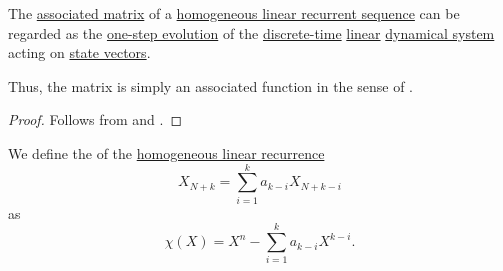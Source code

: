 \begin{corollary}\label{thm:homogeneous_linear_recurrence_as_dynamical_system}
  The \hyperref[def:homogeneous_linear_recurrence_matrix]{associated matrix} of a \hyperref[def:homogeneous_linear_recurrence]{homogeneous linear recurrent sequence} can be regarded as the \hyperref[def:one_step_evolution_function]{one-step evolution} of the \hyperref[def:discrete_dynamical_system]{discrete-time} \hyperref[def:linear_dynamical_system]{linear} \hyperref[def:dynamical_system]{dynamical system} acting on \hyperref[def:recurrence_relation/state]{state vectors}.
\end{corollary}
\begin{comments}
  \item Thus, the matrix is simply an associated function in the sense of .
\end{comments}
\begin{proof}
  Follows from  and .
\end{proof}

\begin{definition}\label{def:linear_recurrence_characteristic_polynomial}
  We define the  of the \hyperref[def:homogeneous_linear_recurrence]{homogeneous linear recurrence}
  \begin{equation*}
    X_{N+k} = \sum_{i=1}^k a_{k-i} X_{N+k-i}
  \end{equation*}
  as
  \begin{equation}\label{eq:def:linear_recurrence_characteristic_polynomial}
    \chi(X) = X^n - \sum_{i=1}^k a_{k-i} X^{k-i}.
  \end{equation}
\end{definition}

